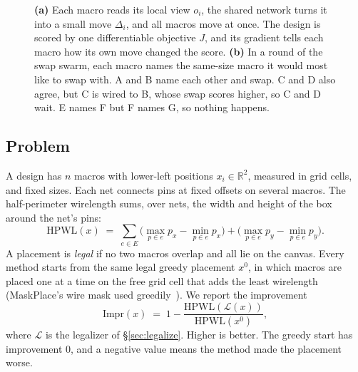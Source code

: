 \documentclass[10pt]{article}
\newcommand{\hpwl}{\mathrm{HPWL}}
\newcommand{\impr}{\mathrm{Impr}}
\begin{document}
\begin{figure}[tbp]
\caption{\textbf{(a)} Each macro reads its local view $o_i$, the shared network turns it into a small move $\Delta_i$, and all macros move at once. The design is scored by one differentiable objective $J$, and its gradient tells each macro how its own move changed the score. \textbf{(b)} In a round of the swap swarm, each macro names the same-size macro it would most like to swap with. A and B name each other and swap. C and D also agree, but C is wired to B, whose swap scores higher, so C and D wait. E names F but F names G, so nothing happens.}
\label{fig:overview}
\end{figure}

\subsection{Problem}
A design has $n$ macros with lower-left positions $x_i\in\mathbb{R}^2$, measured in grid cells, and fixed sizes. Each net connects pins at fixed offsets on several macros. The half-perimeter wirelength sums, over nets, the width and height of the box around the net's pins:
\begin{equation}
\hpwl(x) \;=\; \sum_{e\in E}\Big(\max_{p\in e} p_x-\min_{p\in e} p_x\Big) + \Big(\max_{p\in e} p_y-\min_{p\in e} p_y\Big).
\label{eq:hpwl}
\end{equation}
A placement is \emph{legal} if no two macros overlap and all lie on the canvas. Every method starts from the same legal greedy placement $x^0$, in which macros are placed one at a time on the free grid cell that adds the least wirelength (MaskPlace's wire mask used greedily~\citep{lai2022maskplace,shi2023wiremask}). We report the improvement
\begin{equation}
\impr(x) \;=\; 1-\frac{\hpwl(\mathcal{L}(x))}{\hpwl(x^0)},
\label{eq:impr}
\end{equation}
where $\mathcal{L}$ is the legalizer of \S\ref{sec:legalize}. Higher is better. The greedy start has improvement $0$, and a negative value means the method made the placement worse.
\end{document}
